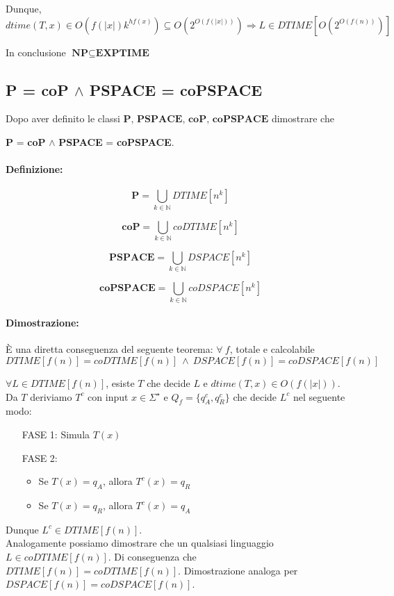 Dunque, $$dtime(T, x) \in O(f(|x|)k^{hf(x)}) \subseteq{O(2^{O(f(|x|))})} \Rightarrow L \in DTIME[O(2^{O(f(n))})]$$

In conclusione $\textbf{NP} \subseteq \textbf{EXPTIME}$

\subsection{\textbf{P} = \textbf{coP} $\land$ \textbf{PSPACE} = \textbf{coPSPACE}}

Dopo aver definito le classi $\textbf{P, PSPACE, coP, coPSPACE}$ dimostrare che 

\textbf{P} = \textbf{coP} $\land$ \textbf{PSPACE} = \textbf{coPSPACE}.

\paragraph*{Definizione:} 

\[
   \textbf{P} = \bigcup_{k\in \mathbb{N}} DTIME[n^k]
\]

\[
   \textbf{coP} = \bigcup_{k\in \mathbb{N}} coDTIME[n^k]
\]

\[
    \textbf{PSPACE} = \bigcup_{k\in \mathbb{N}} DSPACE[n^k]
\]

\[
    \textbf{coPSPACE} = \bigcup_{k\in \mathbb{N}} coDSPACE[n^k]
\]

\paragraph*{Dimostrazione:} È una diretta conseguenza del seguente teorema: $\forall\ f$, totale e calcolabile
$$DTIME[f(n)] = coDTIME[f(n)]\ \land\ DSPACE[f(n)] = coDSPACE[f(n)]$$

$\forall L \in DTIME[f(n)]$, esiste $T$ che decide $L$ e $dtime(T, x) \in O(f(|x|))$. 
Da $T$ deriviamo $T^{c}$ con input $x \in \Sigma^{\star}$ e $Q_{f} = \{q_{A}^{c}, q_{R}^{c}\}$ che decide $L^{c}$ nel seguente modo:

\begin{enumerate}
    \item [FASE 1:] Simula $T(x)$
    \item [FASE 2:]{
        \begin{itemize}
            \item Se $T(x) = q_{A}$, allora $T^{c}(x) = q_{R}$
            \item Se $T(x) = q_{R}$, allora $T^{c}(x) = q_{A}$
        \end{itemize}
    }
\end{enumerate}
Dunque $L^{c} \in DTIME[f(n)]$.\\
Analogamente possiamo dimostrare che un qualsiasi linguaggio $L \in coDTIME[f(n)]$. Di conseguenza che $DTIME[f(n)] = coDTIME[f(n)]$.
Dimostrazione analoga per $DSPACE[f(n)] = coDSPACE[f(n)]$.